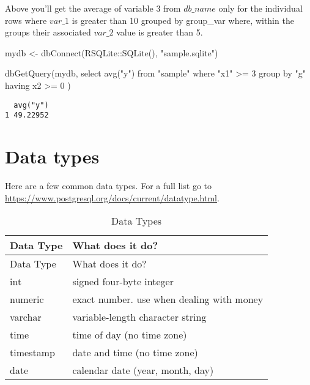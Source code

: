\documentclass[
  letterpaper,
  DIV=11,
  numbers=noendperiod]{scrreprt}
\newenvironment{Shaded}{\begin{snugshade}}{\end{snugshade}}
\newcommand{\FunctionTok}[1]{\textcolor[rgb]{0.28,0.35,0.67}{#1}}
\newcommand{\NormalTok}[1]{\textcolor[rgb]{0.00,0.23,0.31}{#1}}
\newcommand{\OtherTok}[1]{\textcolor[rgb]{0.00,0.23,0.31}{#1}}
\newcommand{\SpecialCharTok}[1]{\textcolor[rgb]{0.37,0.37,0.37}{#1}}
\newcommand{\StringTok}[1]{\textcolor[rgb]{0.13,0.47,0.30}{#1}}
\begin{document}
Above you'll get the average of variable 3 from \(db\_name\) only for
the individual rows where \(var\_1\) is greater than 10 grouped by
group\_var where, within the groups their associated \(var\_2\) value is
greater than 5.

\begin{Shaded}
\begin{Highlighting}[]
\NormalTok{mydb }\OtherTok{\textless{}{-}} \FunctionTok{dbConnect}\NormalTok{(RSQLite}\SpecialCharTok{::}\FunctionTok{SQLite}\NormalTok{(), }\StringTok{"sample.sqlite"}\NormalTok{)}

\FunctionTok{dbGetQuery}\NormalTok{(mydb,}\StringTok{\textquotesingle{}}
\StringTok{  select avg("y")}
\StringTok{  from "sample"}
\StringTok{  where "x1" \textgreater{}= 3 }
\StringTok{  group by "g"}
\StringTok{  having x2 \textgreater{}= 0}
\StringTok{\textquotesingle{}}\NormalTok{)}
\end{Highlighting}
\end{Shaded}

\begin{verbatim}
  avg("y")
1 49.22952
\end{verbatim}

\hypertarget{data-types}{%
\section{Data types}\label{data-types}}

Here are a few common data types. For a full list go to
\url{https://www.postgresql.org/docs/current/datatype.html}.

\begin{longtable}[]{@{}ll@{}}
\caption{Data Types}\tabularnewline
\toprule\noalign{}
Data Type & What does it do? \\
\midrule\noalign{}
\endfirsthead
\toprule\noalign{}
Data Type & What does it do? \\
\midrule\noalign{}
\endhead
\bottomrule\noalign{}
\endlastfoot
int & signed four-byte integer \\
numeric & exact number. use when dealing with money \\
varchar & variable-length character string \\
time & time of day (no time zone) \\
timestamp & date and time (no time zone) \\
date & calendar date (year, month, day) \\
\end{longtable}
\end{document}
